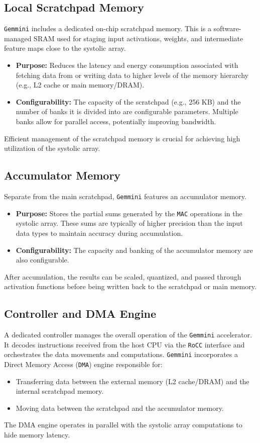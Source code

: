 \subsection{Local Scratchpad Memory}
\label{subsec:gemmini_scratchpad}
\texttt{Gemmini} includes a dedicated on-chip scratchpad memory. This is a software-managed SRAM used for staging input activations, weights, and intermediate feature maps close to the systolic array.
\begin{itemize}
    \item \textbf{Purpose:} Reduces the latency and energy consumption associated with fetching data from or writing data to higher levels of the memory hierarchy (e.g., L2 cache or main memory/DRAM).
    \item \textbf{Configurability:} The capacity of the scratchpad (e.g., 256 KB) and the number of banks it is divided into are configurable parameters. Multiple banks allow for parallel access, potentially improving bandwidth.
\end{itemize}
Efficient management of the scratchpad memory is crucial for achieving high utilization of the systolic array.

\subsection{Accumulator Memory}
\label{subsec:gemmini_accumulator}
Separate from the main scratchpad, \texttt{Gemmini} features an accumulator memory.
\begin{itemize}
    \item \textbf{Purpose:} Stores the partial sums generated by the \texttt{MAC} operations in the systolic array. These sums are typically of higher precision than the input data types to maintain accuracy during accumulation.
    \item \textbf{Configurability:} The capacity and banking of the accumulator memory are also configurable.
\end{itemize}
After accumulation, the results can be scaled, quantized, and passed through activation functions before being written back to the scratchpad or main memory.

\subsection{Controller and DMA Engine}
\label{subsec:gemmini_controller_dma}
A dedicated controller manages the overall operation of the \texttt{Gemmini} accelerator. It decodes instructions received from the host CPU via the \texttt{RoCC} interface and orchestrates the data movements and computations.
\texttt{Gemmini} incorporates a Direct Memory Access (\texttt{DMA}) engine responsible for:
\begin{itemize}
    \item Transferring data between the external memory (L2 cache/DRAM) and the internal scratchpad memory.
    \item Moving data between the scratchpad and the accumulator memory.
\end{itemize}
The DMA engine operates in parallel with the systolic array computations to hide memory latency.

